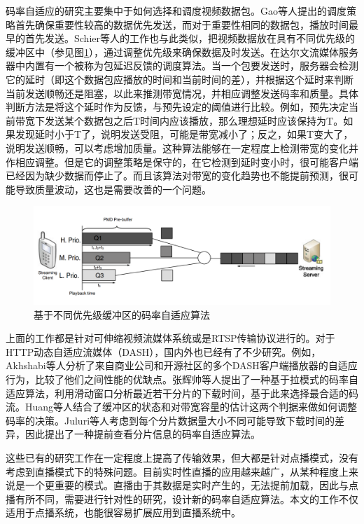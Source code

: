 码率自适应的研究主要集中于如何选择和调度视频数据包。Gao等人\supercite{Gao2006}提出的调度策略首先确保重要性较高的数据优先发送，而对于重要性相同的数据包，播放时间最早的首先发送。Schier等人的工作\supercite{Schierl2010}也与此类似，把视频数据放在具有不同优先级的缓冲区中（参见图\ref{fig:15}\supercite{Schierl2010}），通过调整优先级来确保数据及时发送。在达尔文流媒体服务器中内置有一个被称为包延迟反馈的调度算法。当一个包要发送时，服务器会检测它的延时（即这个数据包应播放的时间和当前时间的差），并根据这个延时来判断当前发送顺畅还是阻塞，以此来推测带宽情况，并相应调整发送码率和质量。具体判断方法是将这个延时作为反馈，与预先设定的阈值进行比较。例如，预先决定当前带宽下发送某个数据包之后T时间内应该播放，那么理想延时应该保持为T。如果发现延时小于T了，说明发送受阻，可能是带宽减小了；反之，如果T变大了，说明发送顺畅，可以考虑增加质量。这种算法能够在一定程度上检测带宽的变化并作相应调整。但是它的调整策略是保守的，在它检测到延时变小时，很可能客户端已经因为缺少数据而停止了。而且该算法对带宽的变化趋势也不能提前预测，很可能导致质量波动，这也是需要改善的一个问题。

\begin{figure}[t]
	\centering
	\includegraphics[width = 1.0\linewidth]{clip/15.png}
	\caption{基于不同优先级缓冲区的码率自适应算法\label{fig:15}}
\end{figure}

上面的工作都是针对可伸缩视频流媒体系统或是RTSP传输协议进行的。对于HTTP动态自适应流媒体（DASH），国内外也已经有了不少研究。例如，Akhshabi等人\supercite{Akhshabi2012}分析了来自商业公司和开源社区的多个DASH客户端播放器的自适应行为，比较了他们之间性能的优缺点。张辉帅等人\supercite{Zhang2013}提出了一种基于拉模式的码率自适应算法，利用滑动窗口分析最近若干分片的下载时间，基于此来选择最合适的码流。Huang等人\supercite{Huang2015}结合了缓冲区的状态和对带宽容量的估计这两个判据来做如何调整码率的决策。Juluri\supercite{Juluri2015}等人考虑到每个分片数据量大小不同可能导致下载时间的差异，因此提出了一种提前查看分片信息的码率自适应算法。

这些已有的研究工作在一定程度上提高了传输效果，但大都是针对点播模式，没有考虑到直播模式下的特殊问题。目前实时性直播的应用越来越广，从某种程度上来说是一个更重要的模式。直播由于其数据是实时产生的，无法提前加载，因此与点播有所不同，需要进行针对性的研究，设计新的码率自适应算法。本文的工作不仅适用于点播系统，也能很容易扩展应用到直播系统中。

